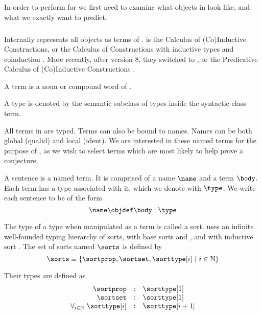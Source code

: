 \subsection{\coq}

In order to perform \premiseselection for \coq we first need to examine what objects in \coq look like, and what we exactly want to predict.

\subsubsection{\pcic}

Internally \coq represents all objects as terms  of \cic {}.
\cic is the Calculus of (Co)Inductive Constructions,
or the Calculus of Constructions \cite{coquand1988calculus} with inductive types and coinduction \cite{huet1987induction} \cite{coquand1990inductively}.
More recently, after \coq version 8, they switched to \pcic {}, or the Predicative Calculus of (Co)Inductive Constructions \cite{bertot2013interactive}.

\begin{definition}[term]
	A term is a noun or compound word of \pcic.
\end{definition}
\begin{definition}[type]
	A type is denoted by the semantic subclass of types inside the syntactic class term.
\end{definition}

All terms in \coq are typed.
Terms can also be bound to names.
Names can be both global (qualid) and local (ident).
We are interested in these named terms for the purpose of \premiseselection, as we wish to select terms which are most likely to help prove a conjecture.

\begin{definition}[sentence]
	A sentence is a named term. It is comprised of a name $\name$ and a term $\body$. Each term has a type associated with it, which we denote with $\type$.
	We write each sentence to be of the form
	\[\name \objdef \body : \type\]
\end{definition}

\begin{definition}[sort]
	The type of a type when manipulated as a term is called a sort.
	\pcic uses an infinite well-founded typing hierarchy of sorts, with base sorts \sortprop and \sortset, and with inductive sort \sorttype.
	The set of sorts named $\sorts$ is defined by
	\[\sorts \equiv \{ \sortprop, \sortset, \sorttype[{i}] ~|~ i \in \mathbb{N} \} \]

	Their types are defined as
	\[
		\begin{array}{rcl}
			\sortprop & : & \sorttype[1] \\
			\sortset & : & \sorttype[1] \\
			\forall_{i \in \mathbb{N}}~ \sorttype[i] & : & \sorttype[{i+1}]
		\end{array}
	\]
\end{definition}

